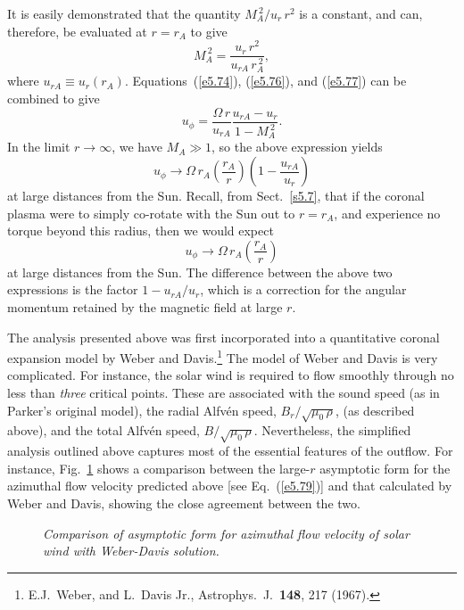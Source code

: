 It is easily demonstrated that the quantity $M_A^{~2}/u_r\,r^2$ is a constant,
and can, therefore, be evaluated at $r=r_A$ to give
\begin{equation}\label{e5.77}
M_A^{~2} = \frac{u_r\,r^2}{u_{rA}\,r_A^{~2}},
\end{equation}
where $u_{rA} \equiv u_r(r_A)$. Equations~(\ref{e5.74}), (\ref{e5.76}), and (\ref{e5.77}) can
be combined to give 
\begin{equation}
u_\phi = \frac{{\Omega}\,r}{u_{rA}} \frac{u_{rA} - u_r}{1-M_A^{~2}}.
\end{equation}
In the limit $r\rightarrow\infty$, we have $M_A\gg 1$, so the above
expression yields
\begin{equation}\label{e5.79}
u_\phi \rightarrow {\Omega}\,r_A\left(\frac{r_A}{r}\right)\left(1-\frac{u_{rA}}
{u_r}\right)
\end{equation}
at large distances from the Sun. Recall, from Sect.~\ref{s5.7}, that if the coronal
plasma were to simply co-rotate with the Sun out to $r=r_A$, and experience
no torque beyond this radius, then we would expect
\begin{equation}
u_\phi \rightarrow {\Omega}\,r_A\left(\frac{r_A}{r}\right)
\end{equation}
at large distances from the Sun.
The difference between the above two expressions is the factor $1-u_{rA}/u_r$,
which is a correction for the angular momentum retained by the magnetic
field at large $r$. 

The analysis presented above was first incorporated into a quantitative
coronal expansion model by Weber and Davis.\footnote{E.J.~Weber, and L.~Davis
Jr., Astrophys.\ J.\ {\bf 148}, 217 (1967).} The model of Weber and Davis is
very complicated. For instance, the solar wind is required to flow smoothly
through no less than {\em three}\/ critical points. These are associated
with the sound speed (as in Parker's original model), the radial Alfv\'{e}n
speed, $B_r/\sqrt{\mu_0\,\rho}$, (as described above), and the total
Alfv\'{e}n speed, $B/\sqrt{\mu_0\,\rho}$. 
Nevertheless, the simplified analysis
outlined above captures most of the essential features of the outflow. 
For instance, Fig.~\ref{f22} shows a comparison between the large-$r$ asymptotic
form for the azimuthal flow velocity predicted above [see Eq.~(\ref{e5.79})] and
that calculated by Weber and Davis, showing the close agreement between 
the two.

\begin{figure}
\epsfysize=3in
\centerline{}
\caption{\em Comparison of asymptotic form for azimuthal flow velocity
of solar wind with Weber-Davis solution.}\label{f22}
\end{figure}

